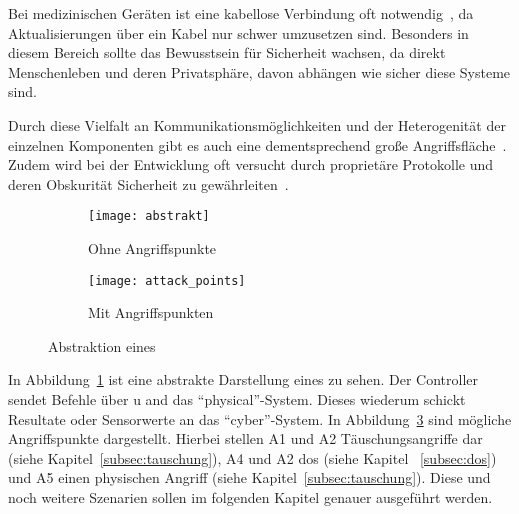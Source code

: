 Bei medizinischen Geräten ist eine kabellose Verbindung oft notwendig~\cite{HLL+17}, da Aktualisierungen über ein Kabel nur schwer umzusetzen sind.
Besonders in diesem Bereich sollte das Bewusstsein für Sicherheit wachsen, da direkt Menschenleben und deren Privatsphäre, davon abhängen wie sicher diese Systeme sind.

Durch diese Vielfalt an Kommunikationsmöglichkeiten und der Heterogenität der einzelnen Komponenten gibt es auch eine dementsprechend große Angriffsfläche~\cite{HLL+17}.
Zudem wird bei der Entwicklung oft versucht durch proprietäre Protokolle und deren Obskurität Sicherheit zu gewährleiten~\cite{HLL+17,SJT2008}.



\begin{figure}
    \centering
    \begin{subfigure}[b]{0.3\textwidth}
        \texttt{[image: abstrakt]}
        \caption{Ohne Angriffspunkte}
        \label{fig:abstrakt}
    \end{subfigure}
    \qquad
    \begin{subfigure}[b]{0.4\textwidth}
        \texttt{[image: attack\_points]}
        \caption{Mit Angriffspunkten}
        \label{fig:attack_points}
    \end{subfigure}
    \caption{Abstraktion eines \cps~\cite{CAS08}}
\end{figure}

In Abbildung~\ref{fig:abstrakt} ist eine abstrakte Darstellung eines \cps zu sehen.
Der Controller sendet Befehle über u and das \enquote{physical}-System.
Dieses wiederum schickt Resultate oder Sensorwerte an das \enquote{cyber}-System.
In Abbildung~\ref{fig:attack_points} sind mögliche Angriffspunkte dargestellt.
Hierbei stellen A1 und A2 Täuschungsangriffe dar (siehe Kapitel~\ref{subsec:tauschung}), A4 und A2 \gls{dos} (siehe Kapitel ~\ref{subsec:dos}) und A5 einen physischen Angriff (siehe Kapitel~\ref{subsec:tauschung}).
Diese und noch weitere Szenarien sollen im folgenden Kapitel genauer ausgeführt werden.



